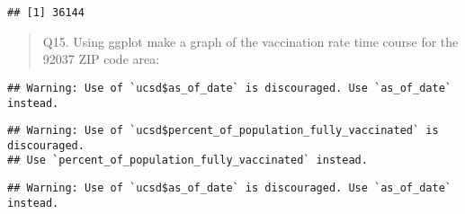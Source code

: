 \documentclass[
]{article}
\newenvironment{Shaded}{\begin{snugshade}}{\end{snugshade}}
\newcommand{\AttributeTok}[1]{\textcolor[rgb]{0.77,0.63,0.00}{#1}}
\newcommand{\DecValTok}[1]{\textcolor[rgb]{0.00,0.00,0.81}{#1}}
\newcommand{\FunctionTok}[1]{\textcolor[rgb]{0.00,0.00,0.00}{#1}}
\newcommand{\NormalTok}[1]{#1}
\newcommand{\SpecialCharTok}[1]{\textcolor[rgb]{0.00,0.00,0.00}{#1}}
\newcommand{\StringTok}[1]{\textcolor[rgb]{0.31,0.60,0.02}{#1}}
\begin{document}
\begin{Shaded}
\end{Shaded}

\begin{verbatim}
## [1] 36144
\end{verbatim}

\begin{quote}
Q15. Using ggplot make a graph of the vaccination rate time course for
the 92037 ZIP code area:
\end{quote}

\begin{Shaded}
\end{Shaded}

\begin{verbatim}
## Warning: Use of `ucsd$as_of_date` is discouraged. Use `as_of_date` instead.
\end{verbatim}

\begin{verbatim}
## Warning: Use of `ucsd$percent_of_population_fully_vaccinated` is discouraged.
## Use `percent_of_population_fully_vaccinated` instead.
\end{verbatim}

\begin{verbatim}
## Warning: Use of `ucsd$as_of_date` is discouraged. Use `as_of_date` instead.
\end{verbatim}
\end{document}
